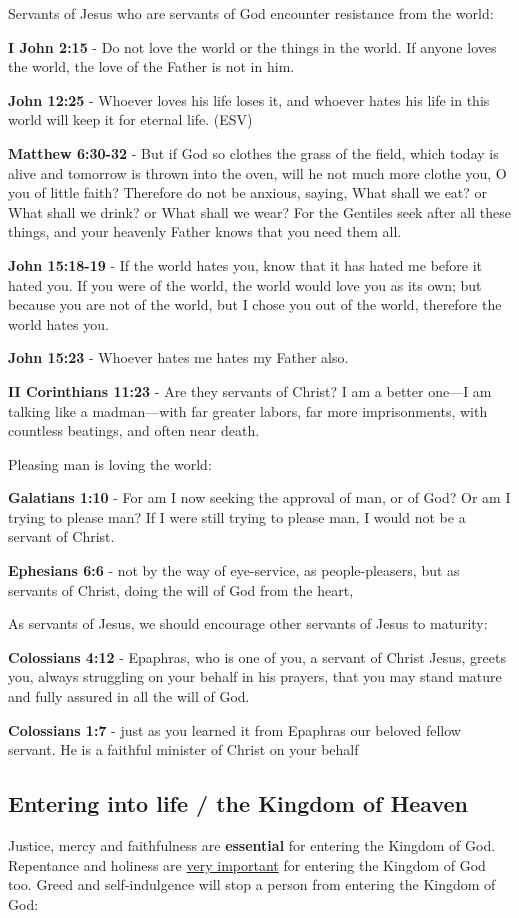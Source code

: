 \documentclass[11pt]{article}
\begin{document}
Servants of Jesus who are servants of God encounter resistance from the world:

\textbf{I John 2:15} - Do not love the world or the things in the world. If anyone loves the world, the love of the Father is not in him.

\textbf{John 12:25} -  Whoever loves his life loses it, and whoever hates his life in this world will keep it for eternal life.  (ESV)

\textbf{Matthew 6:30-32} - But if God so clothes the grass of the field, which today is alive and tomorrow is thrown into the oven, will he not much more clothe you, O you of little faith? Therefore do not be anxious, saying, What shall we eat? or What shall we drink? or What shall we wear? For the Gentiles seek after all these things, and your heavenly Father knows that you need them all.

\textbf{John 15:18-19} - If the world hates you, know that it has hated me before it hated you. If you were of the world, the world would love you as its own; but because you are not of the world, but I chose you out of the world, therefore the world hates you.

\textbf{John 15:23} - Whoever hates me hates my Father also.

\textbf{II Corinthians 11:23} - Are they servants of Christ? I am a better one—I am talking like a madman—with far greater labors, far more imprisonments, with countless beatings, and often near death.

Pleasing man is loving the world:

\textbf{Galatians 1:10} - For am I now seeking the approval of man, or of God? Or am I trying to please man? If I were still trying to please man, I would not be a servant of Christ.

\textbf{Ephesians 6:6} - not by the way of eye-service, as people-pleasers, but as servants of Christ, doing the will of God from the heart,

As servants of Jesus, we should encourage other servants of Jesus to maturity:

\textbf{Colossians 4:12} - Epaphras, who is one of you, a servant of Christ Jesus, greets you, always struggling on your behalf in his prayers, that you may stand mature and fully assured in all the will of God.

\textbf{Colossians 1:7} - just as you learned it from Epaphras our beloved fellow servant. He is a faithful minister of Christ on your behalf

\subsection{Entering into life / the Kingdom of Heaven}
\label{sec:orgfc40928}
Justice, mercy and faithfulness are \textbf{essential} for entering the Kingdom of God. Repentance and holiness are \uline{very important} for entering the Kingdom of God too.
Greed and self-indulgence will stop a person from entering the Kingdom of God:
\end{document}

